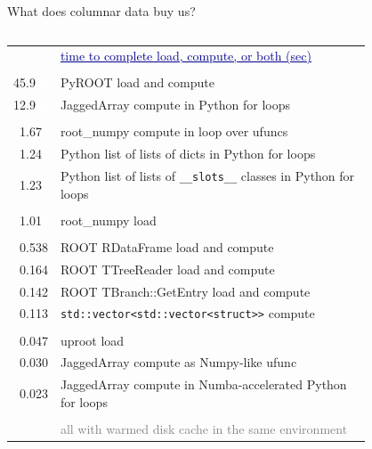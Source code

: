 \documentclass[aspectratio=169]{beamer}
\begin{document}
\begin{frame}{What does columnar data buy us?}
\begin{columns}
\begin{columns}
\begin{tabular}{r p{0.9\linewidth}}
& \textcolor{darkblue}{\small\underline{time to complete load, compute, or both (sec)}} \\
& \\
45.9\textcolor{white}{00} & \textcolor{rootcolor}{PyROOT load and compute} \\
12.9\textcolor{white}{00} & \textcolor{mycolor}{JaggedArray compute in Python for loops} \\
& \\
1.67\textcolor{white}{0} & \textcolor{rootnpcolor}{root\_numpy compute in loop over ufuncs} \\
 1.24\textcolor{white}{0} & \textcolor{pythoncolor}{Python list of lists of dicts in Python for loops} \\
 1.23\textcolor{white}{0} & \textcolor{pythoncolor}{Python list of lists of {\tt\scriptsize \_\_slots\_\_} classes in Python for loops} \\
& \\
 1.01\textcolor{white}{0} & \textcolor{rootnpcolor}{root\_numpy load} \\
& \\
 0.538 & \textcolor{rootcolor}{ROOT RDataFrame load and compute} \\
 0.164 & \textcolor{rootcolor}{ROOT TTreeReader load and compute} \\
 0.142 & \textcolor{rootcolor}{ROOT TBranch::GetEntry load and compute} \\
 0.113 & \textcolor{cppcolor}{{\tt\scriptsize std::vector<std::vector<struct>>} compute} \\
& \\
 0.047 & \textcolor{mycolor}{uproot load} \\
 0.030 & \textcolor{mycolor}{JaggedArray compute as Numpy-like ufunc} \\
 0.023 & \textcolor{mycolor}{JaggedArray compute in Numba-accelerated Python for loops} \\
& \\
& \textcolor{gray}{\scriptsize all with warmed disk cache in the same environment} \\
\end{tabular}
\end{columns}
\end{columns}
\end{frame}
\end{document}
